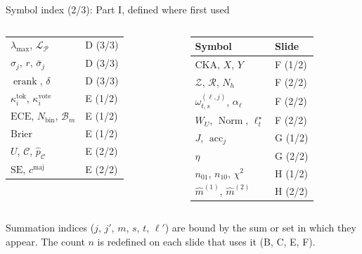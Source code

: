 \documentclass[aspectratio=169,11pt]{beamer}
\newcommand{\acc}{\operatorname{acc}}
\newcommand{\gnote}[1]{{\scriptsize\color{cGray}#1}}
\begin{document}
\begin{frame}{Symbol index (2/3): Part I, defined where first used}
\begin{columns}[T]
\begin{tabular}{@{}ll@{}}
$\lambda_{\max}$, $\mathcal L_{\mathcal P}$ & D (3/3)\\
$\sigma_j$, $r$, $\bar\sigma_j$ & D (3/3)\\
$\operatorname{erank}$, $\delta$ & D (3/3)\\
$\kappa^{\mathrm{tok}}_i$, $\kappa^{\mathrm{vote}}_i$ & E (1/2)\\
$\mathrm{ECE}$, $N_{\mathrm{bin}}$, $\mathcal B_m$ & E (1/2)\\
$\mathrm{Brier}$ & E (1/2)\\
$U$, $\mathcal C$, $\hat p_{\mathcal C}$ & E (2/2)\\
$\mathrm{SE}$, $c^{\mathrm{maj}}$ & E (2/2)\\
\bottomrule
\end{tabular}
\begin{tabular}{@{}ll@{}}
\toprule
\textbf{Symbol} & \textbf{Slide}\\ \midrule
$\mathrm{CKA}$, $X$, $Y$ & F (1/2)\\
$\mathcal Z$, $\mathcal R$, $N_h$ & F (2/2)\\
$\omega^{(\ell,j)}_{t,s}$, $\alpha_\ell$ & F (2/2)\\
$W_U$, $\operatorname{Norm}$, $\ell^\star_t$ & F (2/2)\\
$J$, $\acc_j$ & G (1/2)\\
$\eta$ & G (2/2)\\
$n_{01}$, $n_{10}$, $\chi^2$ & H (1/2)\\
$\hat m^{(1)}$, $\hat m^{(2)}$ & H (2/2)\\
\bottomrule
\end{tabular}
\end{columns}
\vspace{4pt}
\gnote{Summation indices ($j$, $j'$, $m$, $s$, $t$, $\ell'$) are bound by the sum or set in which they appear. The count $n$ is redefined on each slide that uses it (B, C, E, F).}
\end{frame}
\end{document}
